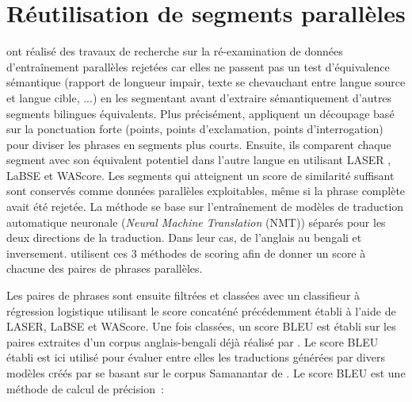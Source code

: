 \section{Réutilisation de segments parallèles}

\citet{steingrimsson_2023} ont réalisé des travaux de recherche sur la ré-examination de données
d'entraînement parallèles rejetées car elles ne passent pas un test d'équivalence sémantique (rapport de longueur impair,
texte se chevauchant entre langue source et langue cible, ...) en les segmentant avant d'extraire sémantiquement d'autres segments
bilingues équivalents. Plus précisément, \citet{steingrimsson_2023} appliquent un découpage basé sur la ponctuation forte (points,
points d'exclamation, points d'interrogation) pour diviser les phrases en segments plus courts. Ensuite,
ils comparent chaque segment avec son équivalent potentiel dans l'autre langue en utilisant LASER \citep{artetxe_2019}, LaBSE \citep{feng__2022} et WAScore.
Les segments qui atteignent un score de similarité suffisant sont conservés comme données parallèles exploitables,
même si la phrase complète avait été rejetée. La méthode se base sur l'entraînement de modèles de traduction
automatique neuronale (\textit{Neural Machine Translation} (NMT)) séparés pour les deux directions de la traduction.
Dans leur cas, de l'anglais au bengali et inversement. \citet{steingrimsson_2023} utilisent ces 3 méthodes de scoring
afin de donner un score à chacune des paires de phrases parallèles.

Les paires de phrases sont ensuite filtrées et classées avec un classifieur à \gls{régression logistique}
utilisant le score concaténé précédemment établi à l'aide de LASER, LaBSE et WAScore.
Une fois classées, un score \gls{BLEU} est établi sur les paires extraites d'un corpus anglais-bengali déjà réalisé par
\citet{ramesh_2022}. Le score BLEU établi est ici utilisé pour évaluer entre elles les traductions générées par divers modèles
créés par \citet{steingrimsson_2023} se basant sur le corpus Samanantar de \citet{ramesh_2022}.
Le score BLEU est une méthode de calcul de précision~:

